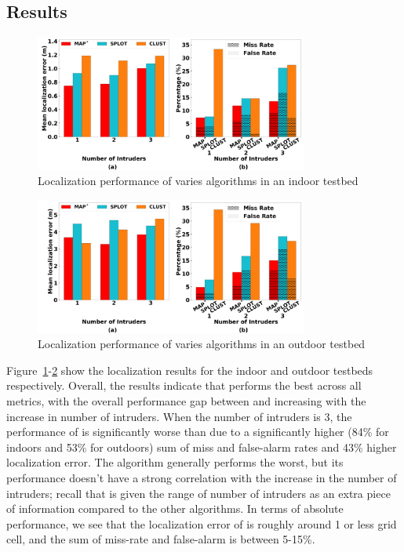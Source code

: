 \subsection{Results}

\begin{figure}
	\centering
	\includegraphics[width=0.8\textwidth]{chapters/ipsn/figures/indoor-error-missfalse.png}
	\caption{Localization performance of varies algorithms in an indoor testbed}
	\label{fig:indoor-error-miss-false}
\end{figure}

\begin{figure}
	\centering
	\includegraphics[width=0.8\textwidth]{chapters/ipsn/figures/outdoor-error-missfalse.png}
	\caption{Localization performance of varies algorithms in an outdoor testbed}
	\label{fig:outdoor-error-miss-false}
\end{figure}

Figure~\ref{fig:indoor-error-miss-false}-\ref{fig:outdoor-error-miss-false}
show the localization results for the indoor and outdoor testbeds
respectively. Overall, the results indicate that \ouralgo performs the
best across all metrics, with the overall performance gap between
\ouralgo and \splot increasing with the increase in number of
intruders. When the number of intruders is 3, the performance of
\splot is significantly worse than \ouralgo due to a
significantly higher (84\% for indoors and 53\% for outdoors) sum of miss and false-alarm rates and 43\% higher localization error.
The \cl algorithm generally performs the worst, but its
performance doesn't have a strong correlation with the increase in the
number of intruders; recall that \cl is given the range of number of
intruders as an extra piece of information compared to the other
algorithms.  In terms of absolute performance, we see that the
localization error of \ouralgo is roughly around 1 or less grid cell,
and the sum of miss-rate and false-alarm is between 5-15\%.

